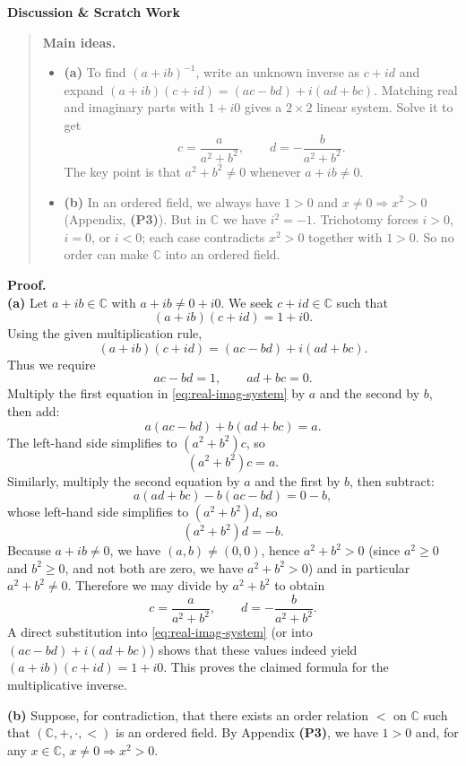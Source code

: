 \documentclass[12pt]{article}
\newenvironment{scratch}{%
  \par\smallskip
  \noindent\textbf{Discussion \& Scratch Work}\begin{quote}\small
}{%
  \end{quote}\smallskip
}
\begin{document}
\begin{scratch}
\textbf{Main ideas.}

\begin{itemize}
\item \textbf{(a)} To find $(a+ib)^{-1}$, write an unknown inverse as $c+id$ and expand
$(a+ib)(c+id)=(ac-bd)+i(ad+bc)$. Matching real and imaginary parts with $1+i0$ gives a $2\times 2$ linear system.
Solve it to get
\[c=\frac{a}{a^2+b^2},\qquad d=-\frac{b}{a^2+b^2}.
\]
The key point is that $a^2+b^2\neq 0$ whenever $a+ib\neq 0$.

\item \textbf{(b)} In an ordered field, we always have $1>0$ and $x\neq 0 \Rightarrow x^2>0$ (Appendix, \textbf{(P3)}).
But in $\mathbb{C}$ we have $i^2=-1$. Trichotomy forces $i>0$, $i=0$, or $i<0$; each case contradicts $x^2>0$ together with $1>0$.
So no order can make $\mathbb{C}$ into an ordered field.
\end{itemize}
\end{scratch}

\textbf{Proof.}\\
\textbf{(a)} Let $a+ib\in\mathbb{C}$ with $a+ib\neq 0+i0$. We seek $c+id\in\mathbb{C}$ such that
\[(a+ib)(c+id)=1+i0.
\]
Using the given multiplication rule,
\[(a+ib)(c+id)=(ac-bd)+i(ad+bc).
\]
Thus we require
\begin{equation}\label{eq:real-imag-system}
ac-bd=1,\qquad ad+bc=0.
\end{equation}
Multiply the first equation in \eqref{eq:real-imag-system} by $a$ and the second by $b$, then add:
\[a(ac-bd)+b(ad+bc)=a.
\]
The left-hand side simplifies to $(a^2+b^2)c$, so
\[(a^2+b^2)c=a.
\]
Similarly, multiply the second equation by $a$ and the first by $b$, then subtract:
\[a(ad+bc)-b(ac-bd)=0-b,
\]
whose left-hand side simplifies to $(a^2+b^2)d$, so
\[(a^2+b^2)d=-b.
\]
Because $a+ib\neq 0$, we have $(a,b)\neq (0,0)$, hence $a^2+b^2>0$ (since $a^2 \geq 0$ and $b^2 \geq 0$, and not both are zero, we have $a^2 + b^2 > 0$) and in particular $a^2+b^2\neq 0$.
Therefore we may divide by $a^2+b^2$ to obtain
\[c=\frac{a}{a^2+b^2},\qquad d=-\frac{b}{a^2+b^2}.
\]
A direct substitution into \eqref{eq:real-imag-system} (or into $(ac-bd)+i(ad+bc)$) shows that these values indeed yield
$(a+ib)(c+id)=1+i0$. This proves the claimed formula for the multiplicative inverse.

\medskip
\textbf{(b)} Suppose, for contradiction, that there exists an order relation $<$ on $\mathbb{C}$ such that
$(\mathbb{C},+,\cdot,<)$ is an ordered field.
By Appendix \textbf{(P3)}, we have $1>0$ and, for any $x\in\mathbb{C}$, $x\neq 0 \Rightarrow x^2>0$.
\end{document}
